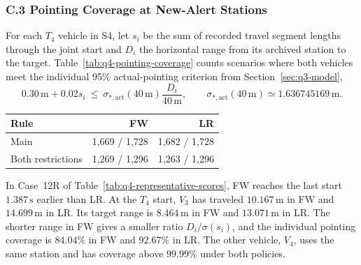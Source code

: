 \documentclass{swmcmthesis}
\begin{document}
\subsubsection*{C.3 Pointing Coverage at New-Alert Stations}
\label{app:q4-pointing}

For each \(T_4\) vehicle in S4, let \(s_i\) be the sum of recorded travel segment lengths through the joint start and \(D_i\) the horizontal range from its archived station to the target. Table~\ref{tab:q4-pointing-coverage} counts scenarios where both vehicles meet the individual 95\% actual-pointing criterion from Section~\ref{sec:q3-model},
\begin{equation}
\label{eq:q4-new-station-coverage}
0.30\,\mathrm m+0.02s_i\ \le\ \sigma_{*,\mathrm{act}}(40\,\mathrm m)\frac{D_i}{40\,\mathrm m},
\qquad \sigma_{*,\mathrm{act}}(40\,\mathrm m)\simeq 1.636745169\,\mathrm m.
\end{equation}
\begin{center}
    \begin{minipage}{\linewidth}
    \centering
    \captionsetup{type=table}
    \caption{Scenarios with \(T_4\) in which both assigned vehicles individually reach 95\% modeled actual-pointing coverage.}
    \label{tab:q4-pointing-coverage}
    \setlength{\tabcolsep}{5pt}
    \begin{tabular}{@{}lrr@{}}
        \toprule
        Rule & FW & LR \\
        \midrule
        Main & 1,669 / 1,728 & 1,682 / 1,728 \\
        Both restrictions & 1,269 / 1,296 & 1,263 / 1,296 \\
        \bottomrule
    \end{tabular}
    \end{minipage}
\end{center}

In Case~12R of Table~\ref{tab:q4-representative-scores}, FW reaches the last start \(1.387\,\mathrm s\) earlier than LR. At the \(T_4\) start, \(V_3\) has traveled \(10.167\,\mathrm m\) in FW and \(14.699\,\mathrm m\) in LR. Its target range is \(8.464\,\mathrm m\) in FW and \(13.071\,\mathrm m\) in LR. The shorter range in FW gives a smaller ratio \(D_i/\sigma(s_i)\), and the individual pointing coverage is \(84.04\%\) in FW and \(92.67\%\) in LR. The other vehicle, \(V_4\), uses the same station and has coverage above \(99.99\%\) under both policies.
\end{document}
